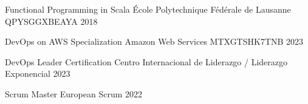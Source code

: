 

\begin{cvhonors}
  \cvhonor
  {Functional Programming in Scala} %
  {École Polytechnique Fédérale de Lausanne} %
  {QPYSGGXBEAYA} %
  {2018} %

  \cvhonor
  {DevOps on AWS Specialization} %
  {Amazon Web Services} %
  {MTXGTSHK7TNB} %
  {2023} %

  \cvhonor
  {DevOps Leader Certification} %
  {Centro Internacional de Liderazgo / Liderazgo Exponencial} %
  {} %
  {2023} %

  \cvhonor
  {Scrum Master} %
  {European Scrum} %
  {} %
  {2022} %
\end{cvhonors}
